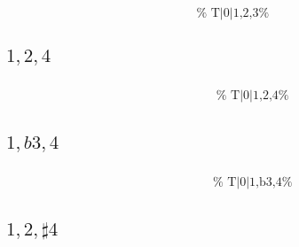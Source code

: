 \documentclass[english]{./gbook}
\begin{document}
\begin{large}
\[\begin{array}{ll}
&
	\text{
	}
\end{array}
\]


\subsection*{$1,2,4$}
\[
\begin{array}{ll}
	\begin{array}{c}
		\begin{array}{ccc}
			&%
			&%
		\end{array}
		\\
		\begin{array}{cc}
			&%
		\end{array}
	\end{array}

&
	\text{
	}
\end{array}
\]

\subsection*{$1,b3,4$}
\[
\begin{array}{ll}
	\begin{array}{c}
		\begin{array}{ccc}
			&%
			&%
		\end{array}
		\\
		\begin{array}{cc}
			&%
		\end{array}
	\end{array}

&
	\text{
	}
\end{array}
\]

\subsection*{$1,2,\sharp4$}
\[
\begin{array}{ll}
	\begin{array}{c}
		\begin{array}{ccc}
			&%
			&%
		\end{array}
		\\
		\begin{array}{cc}
			&%
		\end{array}
	\end{array}


\end{array}\]
\end{large}
\end{document}
